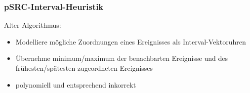\documentclass[ignorenonframetext]{beamer}
\newcommand{\mybreak}{\par\vspace*{\baselineskip}}
\begin{document}
\begin{frame}
\frametitle{pSRC-Interval-Heuristik}\mybreak
Alter Algorithmus:

\begin{itemize}
\item Modelliere mögliche Zuordnungen eines Ereignisses als Interval-Vektoruhren
\item Übernehme minimum/maximum der benachbarten Ereignisse und des frühesten/spätesten zugeordneten Ereignisses
\item polynomiell und entsprechend inkorrekt
\end{itemize}


\end{frame}

\end{document}
